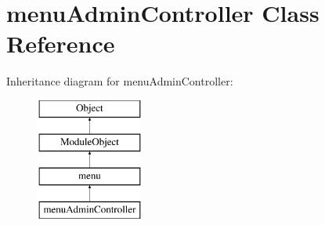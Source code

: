 \hypertarget{classmenuAdminController}{\section{menu\-Admin\-Controller Class Reference}
\label{classmenuAdminController}
}
Inheritance diagram for menu\-Admin\-Controller\-:\begin{figure}[H]
\begin{center}
\leavevmode
\includegraphics[height=4.000000cm]{classmenuAdminController}
\end{center}
\end{figure}
